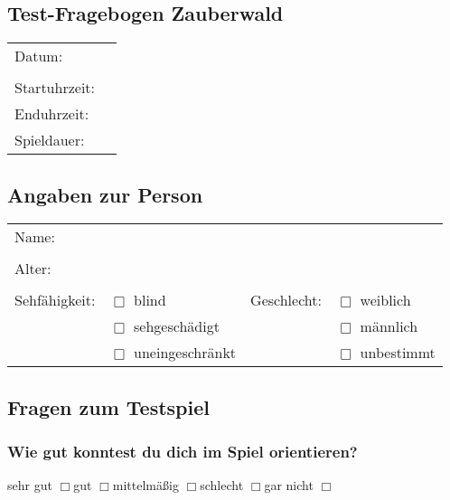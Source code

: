 \subsection*{Test-Fragebogen Zauberwald}
\begin{table}[h]
\begin{tabular}{ll}
Datum: &\\
\\
Startuhrzeit: & \\
Enduhrzeit: & \\
Spieldauer: & \\
\end{tabular}
\end{table}

\subsection*{Angaben zur Person}

\begin{table}[h]
\begin{tabular}{llll}
Name:         &  &  & \\
\\
Alter:        &  &  & \\
\\
Sehfähigkeit: & $\Box{}$ blind           & Geschlecht: & $\Box{}$ weiblich\\
			  & $\Box{}$ sehgeschädigt   & 			   & $\Box{}$ männlich\\
			  & $\Box{}$ uneingeschränkt & 			   & $\Box{}$ unbestimmt\\
\end{tabular}
\end{table}



\subsection*{Fragen zum Testspiel}

\subsubsection*{Wie gut konntest du dich im Spiel orientieren?}
\noindent
sehr gut $\Box{}$\hspace{0.5cm}gut $\Box{}$\hspace{0.5cm}mittelmäßig
$\Box{}$\hspace{0.5cm}schlecht $\Box{}$\hspace{0.5cm}gar nicht $\Box{}$

